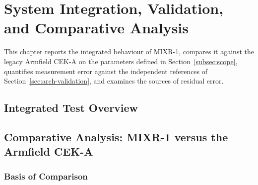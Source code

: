 
\chapter{System Integration, Validation, and Comparative Analysis}
\label{ch:validation}

\ifpdf
    \graphicspath{{Chapter7/Figs/Raster/}{Chapter7/Figs/PDF/}{Chapter7/Figs/}}
\else
    \graphicspath{{Chapter7/Figs/Vector/}{Chapter7/Figs/}}
\fi

This chapter reports the integrated behaviour of MIXR-1, compares it against the legacy Armfield CEK-A on the parameters defined in Section~\ref{subsec:scope}, quantifies measurement error against the independent references of Section~\ref{sec:arch-validation}, and examines the sources of residual error.


\section{Integrated Test Overview}
\label{sec:val-overview}



\section{Comparative Analysis: MIXR-1 versus the Armfield CEK-A}
\label{sec:val-comparison}

\subsection{Basis of Comparison}
\label{subsec:val-basis}


